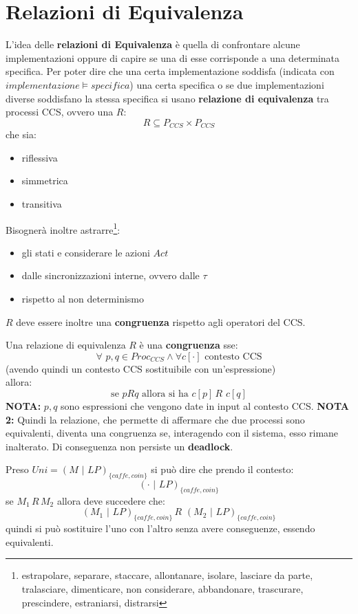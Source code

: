 \section{Relazioni di Equivalenza}
L'idea delle \textbf{relazioni di Equivalenza} è quella di confrontare alcune implementazioni oppure di capire se una di esse corrisponde a una determinata specifica. Per poter dire che una certa implementazione soddisfa (indicata con
$implementazione \vDash specifica$) una certa
specifica o se due implementazioni diverse soddisfano la stessa specifica si usano \textbf{relazione di equivalenza} tra processi CCS, ovvero una $R$:
\[R\subseteq P_{CCS}\times P_{CCS}\]
che sia:
\begin{itemize}
  \item riflessiva
  \item simmetrica
  \item transitiva
\end{itemize}
Bisognerà inoltre astrarre\footnote{estrapolare, separare, staccare, allontanare, isolare, lasciare da parte, tralasciare, dimenticare, non considerare, abbandonare, trascurare, prescindere, estraniarsi, distrarsi}:
\begin{itemize}
  \item gli stati e considerare le azioni $Act$
  \item dalle sincronizzazioni interne, ovvero dalle $\tau$
  \item rispetto al non determinismo
\end{itemize}
$R$ deve essere inoltre una \textbf{congruenza} rispetto agli operatori del CCS.\\
\begin{definizione}
  Una relazione di equivalenza $R$ è una \textbf{congruenza} sse:
  \[\forall \,\, p, q\in Proc_{CCS} \land \forall c[\cdot] \mbox{ contesto CCS}\]
  (avendo quindi un contesto CCS sostituibile con un'espressione)\\
  allora:
  \[\mbox{se }pRq\mbox{ allora si ha }c[p]\, R\,\, c[q]\]
\textbf{NOTA:} $p,q$ sono espressioni che vengono date in input al contesto CCS.
\textbf{NOTA 2:} Quindi la relazione, che permette di affermare che due processi sono equivalenti, diventa una congruenza se, interagendo con il sistema, esso rimane inalterato. Di conseguenza non persiste un \textbf{deadlock}.
\end{definizione}
\begin{esempio}
  Preso $Uni=(M\,\,|\,\, LP)_{\{caffe, coin\}}$ si può dire che prendo il contesto:
  \[(\cdot\,\,|\,\, LP)_{\{caffe, coin\}}\]
  se $M_1\, R\, M_2$ allora deve succedere che:
  \[(M_1\,\,|\,\, LP)_{\{caffe, coin\}}\, R\,\,(M_2\,\,|\,\, LP)_{\{caffe, coin\}}\]
  quindi si può sostituire l'uno con l'altro senza avere conseguenze, essendo
  equivalenti.
\end{esempio}
